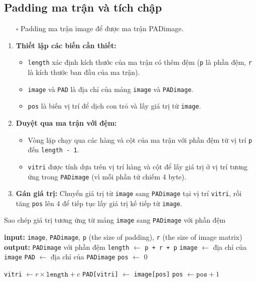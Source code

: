 \documentclass{article}
\begin{document}
\subsection{Padding ma trận và tích chập}
\begin{itemize}
	\item [$\square$] Padding ma trận image để được ma trận PADimage.
\end{itemize}
\begin{enumerate}
	\item \textbf{Thiết lập các biến cần thiết: }
	\begin{itemize}
		\item \texttt{length} xác định kích thước của ma trận có thêm đệm (\texttt{p} là phần đệm, \texttt{r} là kích thước ban đầu của ma trận).
		\item \texttt{image} và \texttt{PAD} là địa chỉ của mảng \texttt{image} và \texttt{PADimage}.
		\item \texttt{pos} là biến vị trí để dịch con trỏ và lấy giá trị từ \texttt{image}.
	\end{itemize} 
	\item \textbf{Duyệt qua ma trận với đệm:}
	\begin{itemize}
		\item Vòng lặp chạy qua các hàng và cột của ma trận với phần đệm từ vị trí \texttt{p} đến \texttt{length - 1}.
		\item \texttt{vitri} được tính dựa trên vị trí hàng và cột để lấy giá trị ở vị trí tương ứng trong \texttt{PADimage} (vì mỗi phần tử chiếm 4 byte).
	\end{itemize} 
	\item \textbf{Gán giá trị:} Chuyển giá trị từ \texttt{image} sang \texttt{PADimage} tại vị trí \texttt{vitri}, rồi tăng \texttt{pos} lên 4 để tiếp tục lấy giá trị kế tiếp từ \texttt{image}.
\end{enumerate}
\begin{algorithm}
	\caption{Sao chép giá trị tương ứng từ mảng \texttt{image} sang \texttt{PADimage} với phần đệm}\label{padding_algorithm}
	\begin{algorithmic}[1]
		\State \textbf{input:} \texttt{image}, \texttt{PADimage}, \texttt{p} (the size of padding), \texttt{r} (the size of image matrix)
		\State \textbf{output:} \texttt{PADimage} với phần đệm
		\State \texttt{length} $\gets$ \texttt{p + r + p}
		\State \texttt{image} $\gets$ địa chỉ của \texttt{image}
		\State \texttt{PAD} $\gets$ địa chỉ của \texttt{PADimage}
		\State \texttt{pos} $\gets$ 0 
		
		\State \texttt{vitri} $\gets r \times \texttt{length} + c$ 
		\State \texttt{PAD[vitri]} $\gets$ \texttt{image[pos]} 
		\State \texttt{pos} $\gets \texttt{pos} + 1$
		\EndFor
		\EndFor
	\end{algorithmic}
\end{algorithm}
\end{document}

